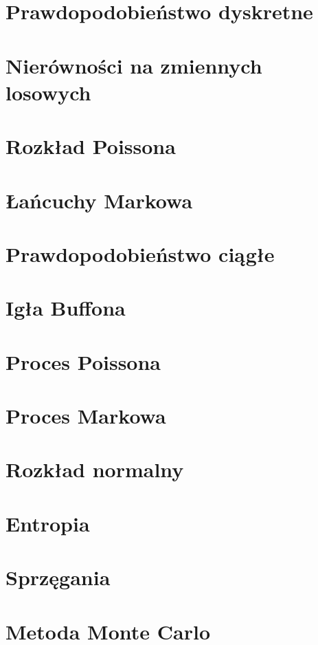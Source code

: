 \documentclass[12pt, a4paper, polish, openany]{book}
\author{
}
\begin{document}
\frontmatter



\tableofcontents


\mainmatter

\chapter{Prawdopodobieństwo dyskretne}


\chapter{Nierówności na zmiennych losowych}


\chapter{Rozkład Poissona}


\chapter{Łańcuchy Markowa}


\chapter{Prawdopodobieństwo ciągłe}


\chapter{Igła Buffona}


\chapter{Proces Poissona}


\chapter{Proces Markowa}


\chapter{Rozkład normalny}


\chapter{Entropia}


\chapter{Sprzęgania}


\chapter{Metoda Monte Carlo}

\end{document}

